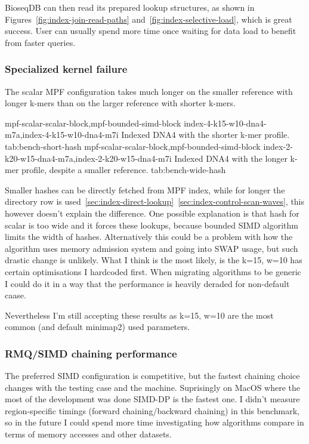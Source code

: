 BioseqDB can then read its prepared lookup structures, as shown in
Figures~\ref{fig:index-join-read-paths} and~\ref{fig:index-selective-load}, which is great success. User can usually spend more time once waiting for data load to benefit from faster queries.

\subsubsection{Specialized kernel failure}
\label{sec:bench-wide-hash}

The scalar MPF configuration takes much longer on the smaller reference with
longer k-mers than on the larger reference with shorter k-mers.

  {mpf-scalar-scalar-block,mpf-bounded-simd-block}
  {index-4-k15-w10-dna4-m7a,index-4-k15-w10-dna4-m7i}
  {Indexed DNA4 with the shorter k-mer profile.}
  {tab:bench-short-hash}
  {mpf-scalar-scalar-block,mpf-bounded-simd-block}
  {index-2-k20-w15-dna4-m7a,index-2-k20-w15-dna4-m7i}
  {Indexed DNA4 with the longer k-mer profile, despite a smaller reference.}
  {tab:bench-wide-hash}


Smaller hashes can be directly fetched from MPF index, while for longer the directory row is used~\ref{sec:index-direct-lookup}~\ref{sec:index-control-scan-waves}, this however doesn't explain the difference.
One possible explanation is that hash for scalar is too wide and it forces these lookups, because bounded SIMD algorithm limits the width of hashes.
Alternatively this could be a problem with how the algorithm uses memory admission system and going into SWAP usage, but such drastic change is unlikely.
What I think is the most likely, is the k=15, w=10 has certain optimisations I hardcoded first. When migrating algorithms to be generic I could do it in a way that the performance is heavily deraded for non-default caase.

Nevertheless I'm still accepting these results as k=15, w=10 are the most common (and default minimap2) used parameters.


\subsubsection{RMQ/SIMD chaining performance}
\label{sec:bench-chaining-choice}

The preferred SIMD configuration is competitive, but the fastest chaining
choice changes with the testing case and the machine. Suprisingly on MacOS where the most of the development was done SIMD-DP is the fastest one.
I didn't measure region-specific timings (forward chaining/backward chaining) in this benchmark, so in the future I could spend more time investigating how algorithms compare in terms of memory accesses and 
other datasets.

